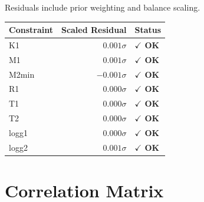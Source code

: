 \documentclass[11pt,a4paper]{article}
\newcommand{\thead}[1]{\textbf{\color{headerfg}#1}}
\begin{document}
{\small Residuals include prior weighting and balance scaling.}
\vspace{0.5em}

\begin{tabular}{l r l}
\rowcolor{headerblue}
\thead{Constraint} & \thead{Scaled Residual} & \thead{Status} \\
\toprule
K1 & $0.001\sigma$ & \textbf{\textcolor{green!70!black}{$\checkmark$ OK}} \\
M1 & $0.001\sigma$ & \textbf{\textcolor{green!70!black}{$\checkmark$ OK}} \\
M2min & $-0.001\sigma$ & \textbf{\textcolor{green!70!black}{$\checkmark$ OK}} \\
R1 & $0.000\sigma$ & \textbf{\textcolor{green!70!black}{$\checkmark$ OK}} \\
T1 & $0.000\sigma$ & \textbf{\textcolor{green!70!black}{$\checkmark$ OK}} \\
T2 & $0.000\sigma$ & \textbf{\textcolor{green!70!black}{$\checkmark$ OK}} \\
logg1 & $0.000\sigma$ & \textbf{\textcolor{green!70!black}{$\checkmark$ OK}} \\
logg2 & $0.001\sigma$ & \textbf{\textcolor{green!70!black}{$\checkmark$ OK}} \\
\bottomrule
\end{tabular}

\section{Correlation Matrix}
\end{document}
